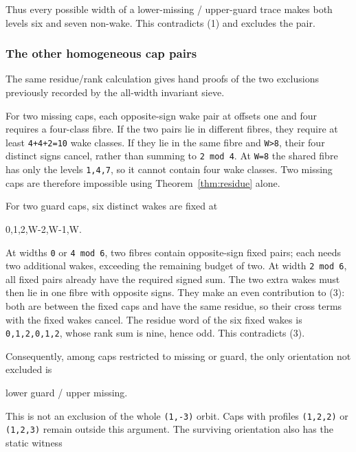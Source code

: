 \documentclass[11pt,letterpaper]{article}
\theoremstyle{plain}
\theoremstyle{definition}
\begin{document}
\begin{NoHyper}
Thus every possible width of a lower-missing / upper-guard trace makes both levels six and seven non-wake. This contradicts (1) and excludes the pair.

\subsubsection{The other homogeneous cap pairs}

The same residue/rank calculation gives hand proofs of the two exclusions previously recorded by the all-width invariant sieve.

For two missing caps, each opposite-sign wake pair at offsets one and four requires a four-class fibre. If the two pairs lie in different fibres, they require at least \texttt{4+4+2=10} wake classes. If they lie in the same fibre and \texttt{W\textgreater{}8}, their four distinct signs cancel, rather than summing to \texttt{2\ mod\ 4}. At \texttt{W=8} the shared fibre has only the levels \texttt{1,4,7}, so it cannot contain four wake classes. Two missing caps are therefore impossible using Theorem~\ref{thm:residue} alone.

For two guard caps, six distinct wakes are fixed at

\begin{codeblock}
0,1,2,W-2,W-1,W.
\end{codeblock}

At widths \texttt{0} or \texttt{4\ mod\ 6}, two fibres contain opposite-sign fixed pairs; each needs two additional wakes, exceeding the remaining budget of two. At width \texttt{2\ mod\ 6}, all fixed pairs already have the required signed sum. The two extra wakes must then lie in one fibre with opposite signs. They make an even contribution to (3): both are between the fixed caps and have the same residue, so their cross terms with the fixed wakes cancel. The residue word of the six fixed wakes is \texttt{0,1,2,0,1,2}, whose rank sum is nine, hence odd. This contradicts (3).

Consequently, among caps restricted to missing or guard, the only orientation not excluded is

\begin{codeblock}
lower guard / upper missing.
\end{codeblock}

This is not an exclusion of the whole \texttt{(1,-3)} orbit. Caps with profiles \texttt{(1,2,2)} or \texttt{(1,2,3)} remain outside this argument. The surviving orientation also has the static witness


\end{NoHyper}
\end{document}
